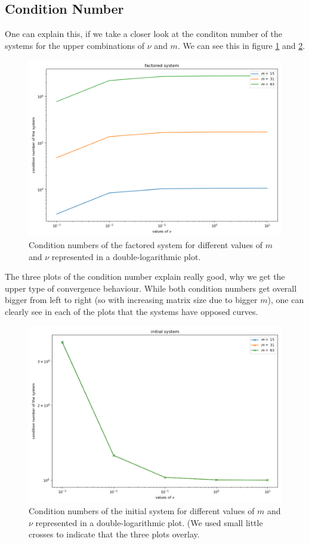 \documentclass{amsart}
\theoremstyle{definition}
\theoremstyle{remark}
\numberwithin{equation}{section}
\begin{document}
\subsection{Condition Number}
One can explain this, if we take a closer look at the conditon number of the systems for the upper combinations of $\nu$ and $m$. We can see this in 
figure \ref{fig:CG-conditionNumber-factored} and \ref{fig:CG-conditionNumber-initial}.
\begin{figure}[h!]
\centering
\includegraphics[scale=0.5]{./imgs/CG_conditionNumber_factored}
\caption{Condition numbers of the factored system for different values of $m$ and $\nu$ represented in a double-logarithmic plot.}
\label{fig:CG-conditionNumber-factored}
\end{figure}
The three plots of the condition number explain really good, why we get the upper type of convergence behaviour. While both condition numbers get overall
bigger from left to right (so with increasing matrix size due to bigger $m$), one can clearly see in each of the plots that the systems have opposed 
curves.

\begin{figure}[h!]
\centering
\includegraphics[scale=0.5]{./imgs/CG_conditionNumber_initial}
\caption{Condition numbers of the initial system for different values of $m$ and $\nu$ represented in a double-logarithmic plot. (We used small little 
crosses to indicate that the three plots overlay.}
\label{fig:CG-conditionNumber-initial}
\end{figure}
\end{document}
